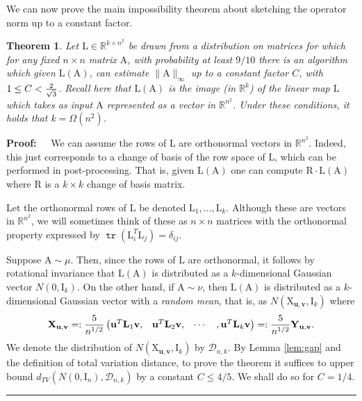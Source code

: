 \documentclass[11pt]{article}
\newtheorem{theorem}{Theorem}
\newenvironment{proof}{\begin{trivlist} \item {\bf Proof:~~}}
  {\qed\end{trivlist}}
\newcommand{\mat}[1]{{\ensuremath{\bm{\mathrm{#1}}}}}
\def\u{{\mathbf u}}
\def\ve{{\mathbf v}}
\def\matA{\mat{A}}
\def\matI{\mat{I}}
\def\matL{\mat{L}}
\def\matR{\mat{R}}
\def\matX{\mat{X}}
\def\matY{\mat{Y}}
\def\frac#1#2{{#1\over #2}}
\def\qed{\hfill\rule{2mm}{2mm}}
\DeclareMathOperator{\tr}{\mathtt{tr}}
\begin{document}
We can now prove the main impossibility theorem about sketching the operator norm up to a constant factor. 
\begin{theorem}\cite{r14}
Let $\matL \in \mathbb{R}^{k \times n^2}$ be drawn from a distribution on matrices for which for any fixed $n \times n$
matrix $\matA$, with probability at least $9/10$ 
there is an algorithm which given $\matL(\matA)$, can estimate $\|\matA\|_{\infty}$ up to a constant factor $C$, 
with $1 \leq C < \frac{2}{\sqrt{3}}$. Recall here that $\matL(\matA)$ is the image (in $\mathbb{R}^k$) of the linear map $\matL$ which
takes as input $\matA$ represented as a vector in $\mathbb{R}^{n^2}$.
Under these conditions, it holds that $k = \Omega(n^2)$. 
\end{theorem}
\begin{proof}
We can assume the rows of $\matL$ are orthonormal vectors in $\mathbb{R}^{n^2}$. Indeed, this just corresponds to a change
of basis of the row space of $\matL$, which can be performed in post-processing. That is, given $\matL(\matA)$ one
can compute $\matR \cdot \matL(\matA)$ where $\matR$ is a $k \times k$ change of basis matrix.

Let the orthonormal rows of
$\matL$ be denoted $\matL_1, \ldots, \matL_k$. Although these are vectors in $\mathbb{R}^{n^2}$, we will sometimes think
of these as $n \times n$ matrices with the orthonormal property expressed by $\tr(\matL_i^T \matL_j) = \delta_{ij}$. 

Suppose $\matA \sim \mu$. Then, since the rows of $\matL$ are orthonormal, it follows by rotational invariance 
that $\matL(\matA)$ is distributed as a $k$-dimensional Gaussian vector $N(0, \matI_k)$. 
On the other hand, if $\matA \sim \nu$, then 
$\matL(\matA)$ is distributed as a $k$-dimensional Gaussian vector with a {\it random mean}, that is, as
$N(\matX_{\u, \ve}, \matI_k)$ where
\[
\matX_{\u,\ve} =: \frac{5}{n^{1/2}}\begin{pmatrix}
\u^T \matL_1 \ve, & \u^T \matL_2 \ve, & \cdots &, \u^T \matL_k \ve
\end{pmatrix} =: \frac{5}{n^{1/2}} \matY_{\u,\ve}.
\]
We denote the distribution of $N(\matX_{\u,\ve}, \matI_k)$ by $\mathcal{D}_{n,k}$. 
By Lemma \ref{lem:gap} and the definition of total variation distance, 
to prove the theorem it suffices to upper bound $d_{TV}(N(0,\matI_n), \mathcal{D}_{n,k})$ by a constant $C \leq 4/5$. We shall
do so for $C = 1/4$. 


\end{proof}
\end{document}
